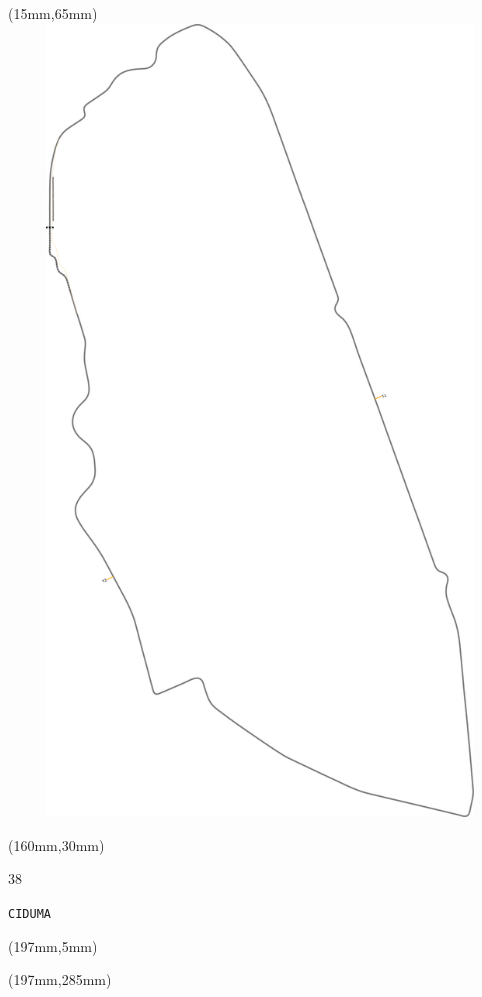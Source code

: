 \begin{textblock*}{185mm}(15mm,65mm)%
\centering
\mbox{\includegraphics[width=185mm,height=210mm,keepaspectratio]{PT/CIDUMA.pdf}}
\end{textblock*}
\begin{textblock*}{40mm}(160mm,30mm)%
\Large
\par{} 
\par38 
\par\hfill\tiny\tt CIDUMA\\
\end{textblock*}
\begin{textblock*}{20mm}(197mm,5mm)%
\fbox{\thepage}
\label{CIDUMA}
\end{textblock*}
\begin{textblock*}{20mm}(197mm,285mm)%
\fbox{\thepage}
\end{textblock*}

